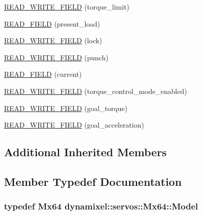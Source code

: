\begin{DoxyCompactItemize}
\item 
\hyperlink{classdynamixel_1_1servos_1_1_mx64_aa1571236546d16cc3cfe42e24108766b}{R\+E\+A\+D\+\_\+\+W\+R\+I\+T\+E\+\_\+\+F\+I\+E\+LD} (torque\+\_\+limit)
\item 
\hyperlink{classdynamixel_1_1servos_1_1_mx64_ad8a89f122af0f01757dda68a458bd328}{R\+E\+A\+D\+\_\+\+F\+I\+E\+LD} (present\+\_\+load)
\item 
\hyperlink{classdynamixel_1_1servos_1_1_mx64_ab2012b3a61a0cd990874e023a22f3a34}{R\+E\+A\+D\+\_\+\+W\+R\+I\+T\+E\+\_\+\+F\+I\+E\+LD} (lock)
\item 
\hyperlink{classdynamixel_1_1servos_1_1_mx64_ae633aa605a331952962ed6dd63dd6431}{R\+E\+A\+D\+\_\+\+W\+R\+I\+T\+E\+\_\+\+F\+I\+E\+LD} (punch)
\item 
\hyperlink{classdynamixel_1_1servos_1_1_mx64_a31ee6cd22dfbc866ecf478f586b7e5c9}{R\+E\+A\+D\+\_\+\+F\+I\+E\+LD} (current)
\item 
\hyperlink{classdynamixel_1_1servos_1_1_mx64_a5bcff2870ae93bbf66bcd2244e7ac58e}{R\+E\+A\+D\+\_\+\+W\+R\+I\+T\+E\+\_\+\+F\+I\+E\+LD} (torque\+\_\+control\+\_\+mode\+\_\+enabled)
\item 
\hyperlink{classdynamixel_1_1servos_1_1_mx64_ae2b1cc35128f0e4aca54aca034c34d34}{R\+E\+A\+D\+\_\+\+W\+R\+I\+T\+E\+\_\+\+F\+I\+E\+LD} (goal\+\_\+torque)
\item 
\hyperlink{classdynamixel_1_1servos_1_1_mx64_a98489b5b6f7280a63f92e57b48610762}{R\+E\+A\+D\+\_\+\+W\+R\+I\+T\+E\+\_\+\+F\+I\+E\+LD} (goal\+\_\+acceleration)
\end{DoxyCompactItemize}
\subsection*{Additional Inherited Members}


\subsection{Member Typedef Documentation}
\subsubsection[{\texorpdfstring{Model}{Model}}]{\setlength{\rightskip}{0pt plus 5cm}typedef {\bf Mx64} {\bf dynamixel\+::servos\+::\+Mx64\+::\+Model}}\hypertarget{classdynamixel_1_1servos_1_1_mx64_ae5a27a1b2e179fcfb77035708795f849}{}\label{classdynamixel_1_1servos_1_1_mx64_ae5a27a1b2e179fcfb77035708795f849}


